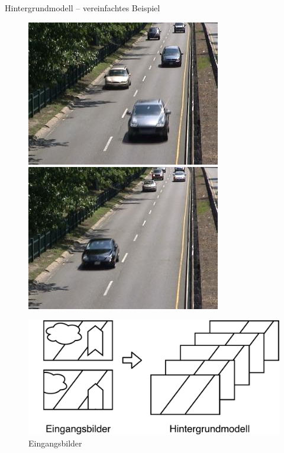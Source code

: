 \documentclass[hyperref={pdfpagelabels=false}]{beamer}
\begin{document}

\begin{frame}[t]{Hintergrundmodell -- vereinfachtes Beispiel}
	\bigskip
	\bigskip
	\begin{figure}%
		\centering
		\begin{minipage}{0.35\linewidth}
			\centering
			\includegraphics[width=0.8\linewidth]{Abbildungen/Eingang1.jpg}\\
			\includegraphics[width=0.8\linewidth]{Abbildungen/Eingang2.jpg}
			\caption*{Eingangsbilder}
		\end{minipage}
		\begin{minipage}{0.08\linewidth}
			\centering
			\includegraphics[width=0.8\linewidth]{Abbildungen/Pfeil.pdf}

\end{minipage}
\end{figure}
\end{frame}
\end{document}
